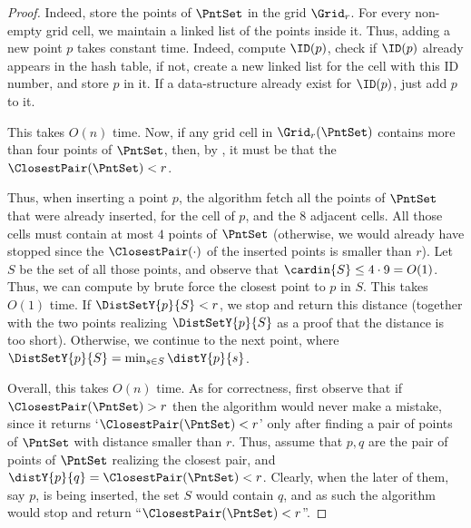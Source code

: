 \begin{proof}
    Indeed, store the points of $\PntSet$ in the grid $\Grid_r$. For every
    non-empty grid cell, we maintain a linked list of the points
    inside it. Thus, adding a new point $p$ takes constant time.
    Indeed, compute $\ID(p)$, check if $\ID(p)$ already appears in the
    hash table, if not, create a new linked list for the cell with
    this ID number, and store $p$ in it. If a data-structure already
    exist for $\ID(p)$, just add $p$ to it.
    
    This takes $O(n)$ time. Now, if any grid cell in
    $\Grid_r(\PntSet)$ contains more than four points of $\PntSet$,
    then, by , it must be that the
    $\ClosestPair(\PntSet) < r$.
    
    Thus, when inserting a point $p$, the algorithm fetch all the
    points of $\PntSet$ that were already inserted, for the cell of
    $p$, and the $8$ adjacent cells. All those cells must contain at
    most $4$ points of $\PntSet$ (otherwise, we would already have
    stopped since the $\ClosestPair(\cdot)$ of the inserted points is
    smaller than $r$). Let $S$ be the set of all those points, and
    observe that $\cardin{S} \leq 4 \cdot 9 = O(1)$. Thus, we can
    compute by brute force the closest point to $p$ in $S$. This takes
    $O(1)$ time. If $\DistSetY{p}{S} < r$, we stop and return this
    distance (together with the two points realizing $\DistSetY{p}{S}$
    as a proof that the distance is too short). Otherwise, we continue
    to the next point, where
    $\DistSetY{p}{S} = \min_{s \in S} \distY{p}{s}$.
    
    Overall, this takes $O(n)$ time. As for correctness, first observe
    that if $\ClosestPair(\PntSet) >r$ then the algorithm would never
    make a mistake, since it returns `$\ClosestPair(\PntSet)<r$' only
    after finding a pair of points of $\PntSet$ with distance smaller
    than $r$.  Thus, assume that $p,q$ are the pair of points of
    $\PntSet$ realizing the closest pair, and
    $\distY{p}{q} = \ClosestPair(\PntSet)<r$.  Clearly, when the later
    of them, say $p$, is being inserted, the set $S$ would contain
    $q$, and as such the algorithm would stop and return
    ``$\ClosestPair(\PntSet) < r$''.
\end{proof}


